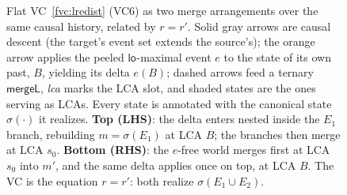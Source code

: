 \documentclass[11pt]{article}
\newcommand{\mergeL}{\mathsf{mergeL}}
\newcommand{\loE}[1]{\mathsf{lo}^{#1}}
\begin{document}
\begin{figure}[tp]
\caption{Flat VC~\ref{fvc:lredist} (VC6) as two merge arrangements over the same
causal history, related by $r=r'$. Solid gray arrows are causal descent (the
target's event set extends the source's); the orange arrow applies the peeled
$\loE{}$-maximal event $e$ to the state of its own past, $B$, yielding its delta
$e(B)$; dashed arrows feed a ternary $\mergeL$, \emph{lca} marks the LCA slot,
and shaded states are the ones serving as LCAs. Every state is annotated with
the canonical state $\sigma(\cdot)$ it realizes. \textbf{Top (LHS)}: the delta
enters nested inside the $E_1$ branch, rebuilding $m=\sigma(E_1)$ at LCA $B$;
the branches then merge at LCA $s_0$. \textbf{Bottom (RHS)}: the $e$-free world
merges first at LCA $s_0$ into $m'$, and the same delta applies once on top, at
LCA $B$. The VC is the equation $r=r'$: both realize $\sigma(E_1\cup E_2)$.}
\label{fig:vc6}
\end{figure}
\end{document}
